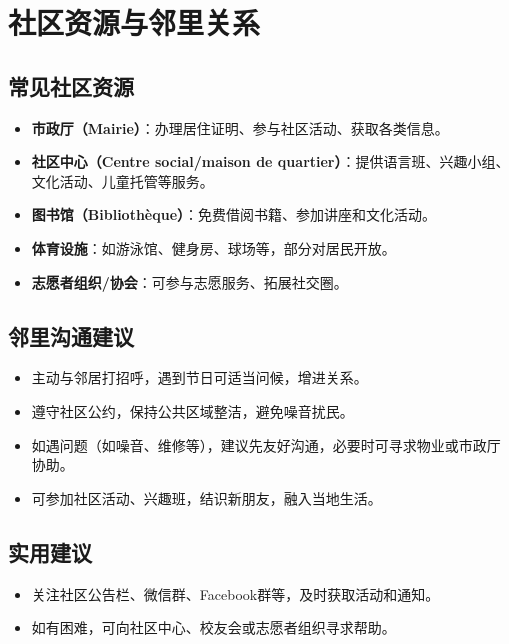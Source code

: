 \section{社区资源与邻里关系}

\subsection{常见社区资源}
\begin{itemize}
    \item \textbf{市政厅（Mairie）}：办理居住证明、参与社区活动、获取各类信息。
    \item \textbf{社区中心（Centre social/maison de quartier）}：提供语言班、兴趣小组、文化活动、儿童托管等服务。
    \item \textbf{图书馆（Bibliothèque）}：免费借阅书籍、参加讲座和文化活动。
    \item \textbf{体育设施}：如游泳馆、健身房、球场等，部分对居民开放。
    \item \textbf{志愿者组织/协会}：可参与志愿服务、拓展社交圈。
\end{itemize}

\subsection{邻里沟通建议}
\begin{itemize}
    \item 主动与邻居打招呼，遇到节日可适当问候，增进关系。
    \item 遵守社区公约，保持公共区域整洁，避免噪音扰民。
    \item 如遇问题（如噪音、维修等），建议先友好沟通，必要时可寻求物业或市政厅协助。
    \item 可参加社区活动、兴趣班，结识新朋友，融入当地生活。
\end{itemize}

\subsection{实用建议}
\begin{itemize}
    \item 关注社区公告栏、微信群、Facebook群等，及时获取活动和通知。
    \item 如有困难，可向社区中心、校友会或志愿者组织寻求帮助。
\end{itemize}
